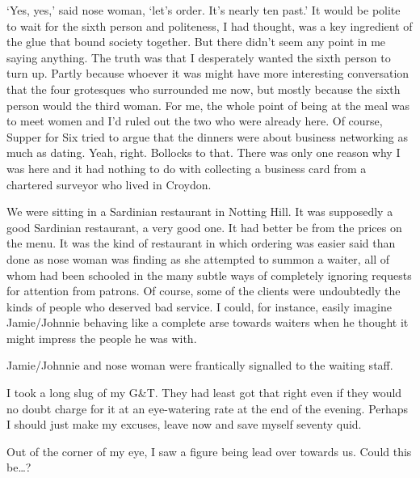`Yes, yes,' said nose woman, `let's order. It's nearly ten past.' It
would be polite to wait for the sixth person and politeness, I had
thought, was a key ingredient of the glue that bound society together. But there didn't seem any point in me
saying anything. The truth was that I desperately wanted the sixth
person to turn up. Partly because whoever it was might have more
interesting conversation that the four grotesques who surrounded me
now, but mostly because the sixth person would the third woman. For
me, the whole point of being at the meal was to meet women and I'd
ruled out the two who were already here. Of course, Supper for Six tried
to argue that the dinners were about business networking as much as
dating. Yeah, right. Bollocks to that. There was only one reason why
I was here and it had nothing to do with collecting a business
card from a chartered surveyor who lived in Croydon.

We were sitting in a Sardinian restaurant in Notting Hill. It was
supposedly a good Sardinian restaurant, a very good one. It had
better be from the prices on the menu. It was the kind of restaurant in which ordering was easier said than
done as nose woman was finding as she attempted to summon a waiter,
all of whom had been schooled in the many subtle ways of completely
ignoring requests for attention from patrons. Of course, some of the clients were undoubtedly the kinds
of people who {\twelveit deserved\/} bad service. I could, for instance, easily
imagine Jamie/Johnnie behaving like a complete arse towards waiters when he thought it might impress the people he was with.

Jamie/Johnnie and nose woman were frantically signalled to the
waiting staff.

I took a long slug of my G{\&}T. They had least got that right even
if they would no doubt charge for it at an eye-watering rate at the
end of the evening. Perhaps I should just make my excuses, leave now and save myself seventy quid.

Out of the corner of my eye, I saw a figure being lead over towards us. Could this be\dots?

